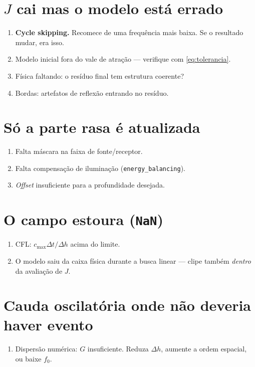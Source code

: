 \documentclass[11pt,a4paper,oneside]{report}
\begin{document}
\section*{$J$ cai mas o modelo está errado}
\begin{enumerate}[leftmargin=*]
\item \textbf{Cycle skipping.} Recomece de uma frequência mais baixa. Se o
resultado mudar, era isso.
\item Modelo inicial fora do vale de atração --- verifique com
\eqref{eq:tolerancia}.
\item Física faltando: o resíduo final tem estrutura coerente?
\item Bordas: artefatos de reflexão entrando no resíduo.
\end{enumerate}

\section*{Só a parte rasa é atualizada}
\begin{enumerate}[leftmargin=*]
\item Falta máscara na faixa de fonte/receptor.
\item Falta compensação de iluminação (\texttt{energy\_balancing}).
\item \emph{Offset} insuficiente para a profundidade desejada.
\end{enumerate}

\section*{O campo estoura (\texttt{NaN})}
\begin{enumerate}[leftmargin=*]
\item CFL: $c_{\max}\Delta t/\Delta h$ acima do limite.
\item O modelo saiu da caixa física durante a busca linear --- clipe também
\emph{dentro} da avaliação de $J$.
\end{enumerate}

\section*{Cauda oscilatória onde não deveria haver evento}
\begin{enumerate}[leftmargin=*]
\item Dispersão numérica: $G$ insuficiente. Reduza $\Delta h$, aumente a ordem
espacial, ou baixe $f_0$.
\end{enumerate}
\end{document}
